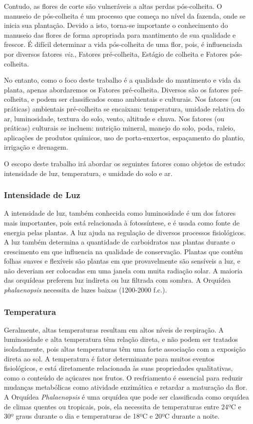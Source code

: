 \documentclass[conference]{IEEEtran}
\begin{document}
Contudo, as flores de corte são vulneráveis a altas perdas pós-colheita. O manuseio de pós-colheita é um processo que começa no nível da fazenda, onde se inicia sua plantação. Devido a isto, torna-se importante o conhecimento do manuseio das flores de forma apropriada para mantimento de sua qualidade e frescor. É difícil determinar a vida pós-colheita de uma flor, pois, é influenciada por diversos fatores {\itshape{viz.}}, Fatores pré-colheita, Estágio de colheita e Fatores pós-colheita.\cite{b1}

No entanto, como o foco deste trabalho é a qualidade do mantimento e vida da planta, apenas abordaremos os Fatores pré-colheita. Diversos são os fatores pré-colheita, e podem ser classificados como ambientais e culturais.
Nos fatores (ou práticas) ambientais pré-colheita se encaixam: temperatura, umidade relativa do ar, luminosidade, textura do solo, vento, altitude e chuva. Nos fatores (ou práticas) culturais se incluem: nutrição mineral, manejo do solo, poda, raleio, aplicações de produtos químicos, uso de porta-enxertos, espaçamento do plantio, irrigação e drenagem.\cite{b3}

O escopo deste trabalho irá abordar os seguintes fatores como objetos de estudo: intensidade de luz, temperatura, e umidade do solo e ar.

\subsubsection{Intensidade de Luz}
A intensidade de luz, também conhecida como luminosidade é um dos fatores mais importantes, pois está relacionada à fotossíntese, e é usada como fonte de energia pelas plantas. A luz ajuda na regulação de diversos processos fisiológicos. A luz também determina a quantidade de carboidratos nas plantas durante o crescimento em que influencia na qualidade de conservação. Plantas que contêm folhas suaves e flexíveis são plantas em que provavelmente são sensíveis a luz, e não deveriam ser colocadas em uma janela com muita radiação solar. A maioria das orquídeas preferem luz indireta ou luz filtrada com sombra. A Orquídea {\itshape{phalaenopsis}} necessita de luzes baixas (1200-2000 f.c.). \cite{b3, b1, b4, b5}

\subsubsection{Temperatura}
Geralmente, altas temperaturas resultam em altos níveis de respiração. A luminosidade e alta temperatura têm relação direta, e não podem ser tratados isoladamente, pois altas temperaturas têm uma forte associação com a exposição direta ao sol. A temperatura é fator determinante para muitos eventos fisiológicos, e está diretamente relacionada às suas propriedades qualitativas, como o conteúdo de açúcares nos frutos. O resfriamento é essencial para reduzir mudanças metabólicas como atividade enzimática e retardar a maturação da flor. A Orquídea {\itshape{Phalaenopsis}} é uma orquídea que pode ser classificada como orquídea de climas quentes ou tropicais, pois, ela necessita de temperaturas entre 24ºC e 30º graus durante o dia e temperaturas de 18ºC e 20ºC durante a noite. \cite{b3, b4, b5, b6, b7}
\end{document}

